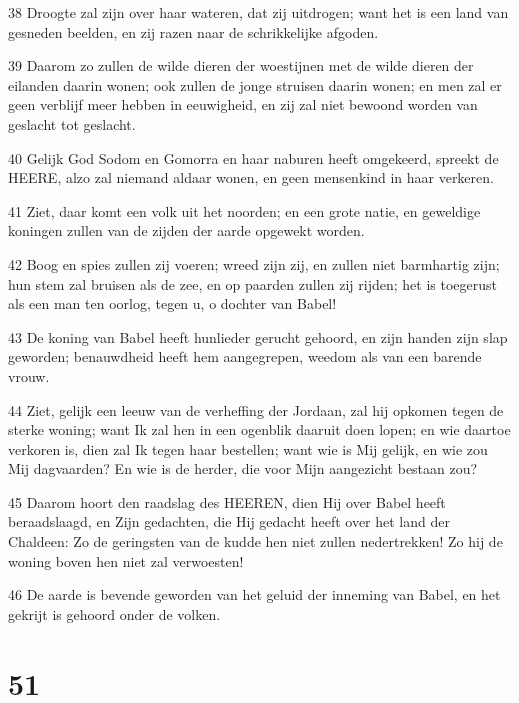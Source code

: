\par 38 Droogte zal zijn over haar wateren, dat zij uitdrogen; want het is een land van gesneden beelden, en zij razen naar de schrikkelijke afgoden.
\par 39 Daarom zo zullen de wilde dieren der woestijnen met de wilde dieren der eilanden daarin wonen; ook zullen de jonge struisen daarin wonen; en men zal er geen verblijf meer hebben in eeuwigheid, en zij zal niet bewoond worden van geslacht tot geslacht.
\par 40 Gelijk God Sodom en Gomorra en haar naburen heeft omgekeerd, spreekt de HEERE, alzo zal niemand aldaar wonen, en geen mensenkind in haar verkeren.
\par 41 Ziet, daar komt een volk uit het noorden; en een grote natie, en geweldige koningen zullen van de zijden der aarde opgewekt worden.
\par 42 Boog en spies zullen zij voeren; wreed zijn zij, en zullen niet barmhartig zijn; hun stem zal bruisen als de zee, en op paarden zullen zij rijden; het is toegerust als een man ten oorlog, tegen u, o dochter van Babel!
\par 43 De koning van Babel heeft hunlieder gerucht gehoord, en zijn handen zijn slap geworden; benauwdheid heeft hem aangegrepen, weedom als van een barende vrouw.
\par 44 Ziet, gelijk een leeuw van de verheffing der Jordaan, zal hij opkomen tegen de sterke woning; want Ik zal hen in een ogenblik daaruit doen lopen; en wie daartoe verkoren is, dien zal Ik tegen haar bestellen; want wie is Mij gelijk, en wie zou Mij dagvaarden? En wie is de herder, die voor Mijn aangezicht bestaan zou?
\par 45 Daarom hoort den raadslag des HEEREN, dien Hij over Babel heeft beraadslaagd, en Zijn gedachten, die Hij gedacht heeft over het land der Chaldeen: Zo de geringsten van de kudde hen niet zullen nedertrekken! Zo hij de woning boven hen niet zal verwoesten!
\par 46 De aarde is bevende geworden van het geluid der inneming van Babel, en het gekrijt is gehoord onder de volken.

\chapter{51}

